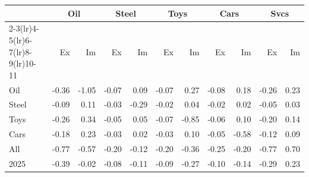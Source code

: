 \begin{tabular}{lrrrrrrrrrr}
\toprule
 & \multicolumn{2}{c}{Oil} & \multicolumn{2}{c}{Steel} & \multicolumn{2}{c}{Toys} & \multicolumn{2}{c}{Cars} & \multicolumn{2}{c}{Svcs} \\
\cmidrule(lr){2-3}\cmidrule(lr){4-5}\cmidrule(lr){6-7}\cmidrule(lr){8-9}\cmidrule(lr){10-11}
 & Ex & Im & Ex & Im & Ex & Im & Ex & Im & Ex & Im \\
\midrule
Oil & -0.36 & -1.05 & -0.07 & 0.09 & -0.07 & 0.27 & -0.08 & 0.18 & -0.26 & 0.23 \\
Steel & -0.09 & 0.11 & -0.03 & -0.29 & -0.02 & 0.04 & -0.02 & 0.02 & -0.05 & 0.03 \\
Toys & -0.26 & 0.34 & -0.05 & 0.05 & -0.07 & -0.85 & -0.06 & 0.10 & -0.20 & 0.14 \\
Cars & -0.18 & 0.23 & -0.03 & 0.02 & -0.03 & 0.10 & -0.05 & -0.58 & -0.12 & 0.09 \\
All & -0.77 & -0.57 & -0.20 & -0.12 & -0.20 & -0.36 & -0.25 & -0.20 & -0.77 & 0.70 \\
2025 & -0.39 & -0.02 & -0.08 & -0.11 & -0.09 & -0.27 & -0.10 & -0.14 & -0.29 & 0.23 \\
\bottomrule
\end{tabular}
